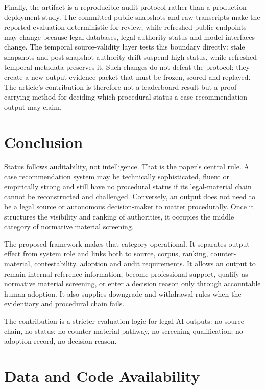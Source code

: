 \documentclass[12pt,a4paper]{article}
\begin{document}
Finally, the artifact is a reproducible audit protocol rather than a production deployment study. The committed public snapshots and raw transcripts make the reported evaluation deterministic for review, while refreshed public endpoints may change because legal databases, legal authority status and model interfaces change. The temporal source-validity layer tests this boundary directly: stale snapshots and post-snapshot authority drift suspend high status, while refreshed temporal metadata preserves it. Such changes do not defeat the protocol; they create a new output evidence packet that must be frozen, scored and replayed. The article's contribution is therefore not a leaderboard result but a proof-carrying method for deciding which procedural status a case-recommendation output may claim.

\section{Conclusion}

Status follows auditability, not intelligence. That is the paper's central rule. A case recommendation system may be technically sophisticated, fluent or empirically strong and still have no procedural status if its legal-material chain cannot be reconstructed and challenged. Conversely, an output does not need to be a legal source or autonomous decision-maker to matter procedurally. Once it structures the visibility and ranking of authorities, it occupies the middle category of normative material screening.

The proposed framework makes that category operational. It separates output effect from system role and links both to source, corpus, ranking, counter-material, contestability, adoption and audit requirements. It allows an output to remain internal reference information, become professional support, qualify as normative material screening, or enter a decision reason only through accountable human adoption. It also supplies downgrade and withdrawal rules when the evidentiary and procedural chain fails.

The contribution is a stricter evaluation logic for legal AI outputs: no source chain, no status; no counter-material pathway, no screening qualification; no adoption record, no decision reason.

\section*{Data and Code Availability}
\end{document}
